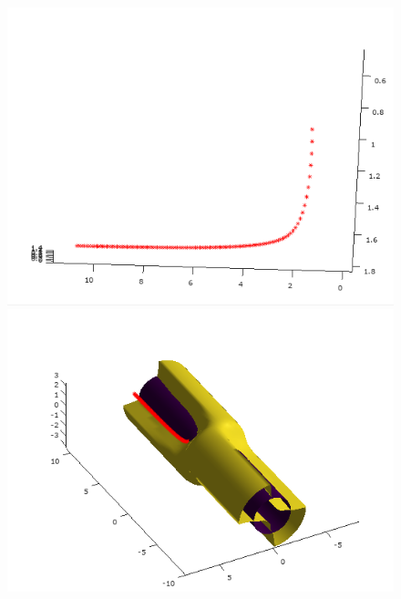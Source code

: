 \documentclass[12pt]{article}
\begin{document}
\begin{minipage}{\textwidth}
\begin{figure}[H]
			\includegraphics[scale=0.47]{primer5_3}
			\includegraphics[scale=0.47]{primer5_4} 
		\end{figure}
	\end{minipage}
	
\end{document}
